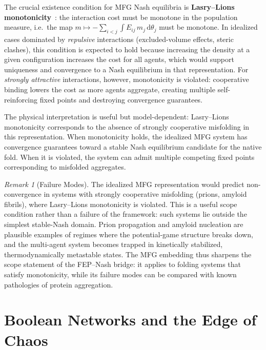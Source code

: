 \documentclass[12pt,a4paper]{article}
\theoremstyle{remark}
\newtheorem{remark}{Remark}
\begin{document}
The crucial existence condition for MFG Nash equilibria is \textbf{Lasry--Lions monotonicity}~\cite{LasryLions2007}: the interaction cost must be monotone in the population measure, i.e.\ the map $m\mapsto -\sum_{i<j}\int E_{ij}\,m_j\,\mathrm{d}\theta_j$ must be monotone. In idealized cases dominated by \emph{repulsive} interactions (excluded-volume effects, steric clashes), this condition is expected to hold because increasing the density at a given configuration increases the cost for all agents, which would support uniqueness and convergence to a Nash equilibrium in that representation. For \emph{strongly attractive} interactions, however, monotonicity is violated: cooperative binding lowers the cost as more agents aggregate, creating multiple self-reinforcing fixed points and destroying convergence guarantees.

The physical interpretation is useful but model-dependent: Lasry--Lions monotonicity corresponds to the absence of strongly cooperative misfolding in this representation. When monotonicity holds, the idealized MFG system has convergence guarantees toward a stable Nash equilibrium candidate for the native fold. When it is violated, the system can admit multiple competing fixed points corresponding to misfolded aggregates.

\begin{remark}[Failure Modes]\label{rem:mfg-failure}
The idealized MFG representation would predict non-convergence in systems with strongly cooperative misfolding (prions, amyloid fibrils), where Lasry--Lions monotonicity is violated. This is a useful scope condition rather than a failure of the framework: such systems lie outside the simplest stable-Nash domain. Prion propagation and amyloid nucleation are plausible examples of regimes where the potential-game structure breaks down, and the multi-agent system becomes trapped in kinetically stabilized, thermodynamically metastable states. The MFG embedding thus sharpens the scope statement of the FEP--Nash bridge: it applies to folding systems that satisfy monotonicity, while its failure modes can be compared with known pathologies of protein aggregation.
\end{remark}

\section{Boolean Networks and the Edge of Chaos}
\label{sec:boolean}
\end{document}
